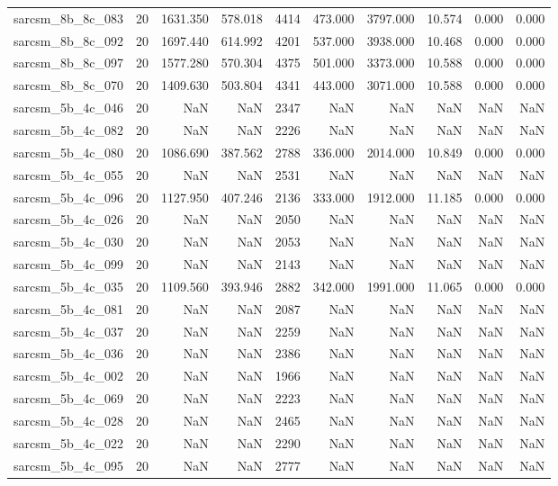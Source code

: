 \begin{tabular}{lrrrrrrrrr}
sarcsm\_8b\_8c\_083 & 20 & 1631.350 & 578.018 & 4414 & 473.000 & 3797.000 & 10.574 & 0.000 & 0.000 \\
sarcsm\_8b\_8c\_092 & 20 & 1697.440 & 614.992 & 4201 & 537.000 & 3938.000 & 10.468 & 0.000 & 0.000 \\
sarcsm\_8b\_8c\_097 & 20 & 1577.280 & 570.304 & 4375 & 501.000 & 3373.000 & 10.588 & 0.000 & 0.000 \\
sarcsm\_8b\_8c\_070 & 20 & 1409.630 & 503.804 & 4341 & 443.000 & 3071.000 & 10.588 & 0.000 & 0.000 \\
sarcsm\_5b\_4c\_046 & 20 & NaN & NaN & 2347 & NaN & NaN & NaN & NaN & NaN \\
sarcsm\_5b\_4c\_082 & 20 & NaN & NaN & 2226 & NaN & NaN & NaN & NaN & NaN \\
sarcsm\_5b\_4c\_080 & 20 & 1086.690 & 387.562 & 2788 & 336.000 & 2014.000 & 10.849 & 0.000 & 0.000 \\
sarcsm\_5b\_4c\_055 & 20 & NaN & NaN & 2531 & NaN & NaN & NaN & NaN & NaN \\
sarcsm\_5b\_4c\_096 & 20 & 1127.950 & 407.246 & 2136 & 333.000 & 1912.000 & 11.185 & 0.000 & 0.000 \\
sarcsm\_5b\_4c\_026 & 20 & NaN & NaN & 2050 & NaN & NaN & NaN & NaN & NaN \\
sarcsm\_5b\_4c\_030 & 20 & NaN & NaN & 2053 & NaN & NaN & NaN & NaN & NaN \\
sarcsm\_5b\_4c\_099 & 20 & NaN & NaN & 2143 & NaN & NaN & NaN & NaN & NaN \\
sarcsm\_5b\_4c\_035 & 20 & 1109.560 & 393.946 & 2882 & 342.000 & 1991.000 & 11.065 & 0.000 & 0.000 \\
sarcsm\_5b\_4c\_081 & 20 & NaN & NaN & 2087 & NaN & NaN & NaN & NaN & NaN \\
sarcsm\_5b\_4c\_037 & 20 & NaN & NaN & 2259 & NaN & NaN & NaN & NaN & NaN \\
sarcsm\_5b\_4c\_036 & 20 & NaN & NaN & 2386 & NaN & NaN & NaN & NaN & NaN \\
sarcsm\_5b\_4c\_002 & 20 & NaN & NaN & 1966 & NaN & NaN & NaN & NaN & NaN \\
sarcsm\_5b\_4c\_069 & 20 & NaN & NaN & 2223 & NaN & NaN & NaN & NaN & NaN \\
sarcsm\_5b\_4c\_028 & 20 & NaN & NaN & 2465 & NaN & NaN & NaN & NaN & NaN \\
sarcsm\_5b\_4c\_022 & 20 & NaN & NaN & 2290 & NaN & NaN & NaN & NaN & NaN \\
sarcsm\_5b\_4c\_095 & 20 & NaN & NaN & 2777 & NaN & NaN & NaN & NaN & NaN \\

\end{tabular}
